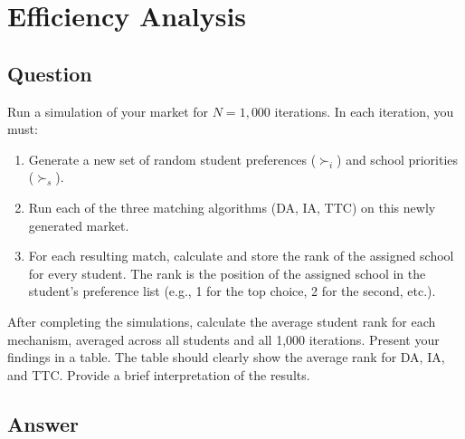 \documentclass[12pt,oneside]{article}
\begin{document}
\section{Efficiency Analysis}
\subsection{Question}
Run a simulation of your market for $N = 1,000$ iterations. In each iteration, you must:
\begin{enumerate}[label=\arabic*.]
    \item Generate a new set of random student preferences ($\succ_i$) and school priorities ($\succ_s$).
    \item Run each of the three matching algorithms (DA, IA, TTC) on this newly generated market.
    \item For each resulting match, calculate and store the rank of the assigned school for every student. The rank is the position of the assigned school in the student's preference list (e.g., 1 for the top choice, 2 for the second, etc.).
\end{enumerate}

After completing the simulations, calculate the average student rank for each mechanism, averaged across all students and all 1,000 iterations. Present your findings in a table. The table should clearly show the average rank for DA, IA, and TTC. Provide a brief interpretation of the results.

\subsection{Answer}


\end{document}
